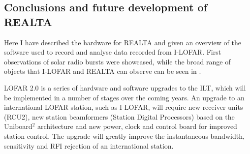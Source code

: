 \subsection{Conclusions and future development of REALTA}
\label{sec:realta_future_work}

Here I have described the hardware for REALTA and given an overview of the software used to record and analyse data recorded from I-LOFAR. First observations of solar radio bursts were showcased, while the broad range of objects that I-LOFAR and REALTA can observe can be seen in \cite{Murphy2021b}. 

LOFAR 2.0 is a series of hardware and software upgrades to the ILT, which will be implemented in a number of stages over the coming years. An upgrade to an international LOFAR station, such as I-LOFAR, will require new receiver units (RCU2), new station beamformers (Station Digital Processors) based on the Uniboard$^2$ architecture \citep{Schoonderbeek2019} and new power, clock and control board for improved station control. The upgrade will greatly improve the instantaneous bandwidth, sensitivity and RFI rejection of an international station.


